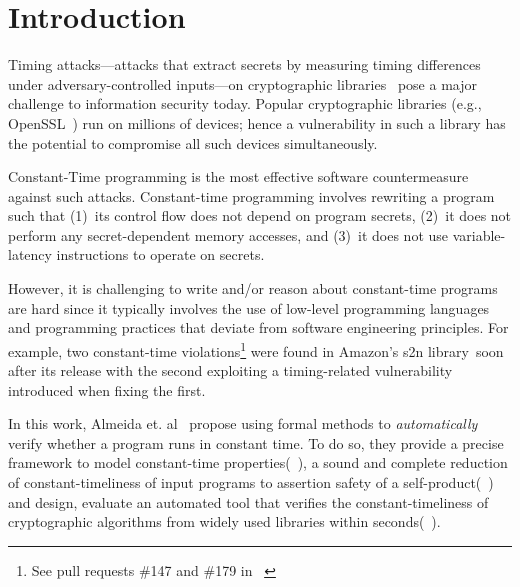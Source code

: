 \section{Introduction}

Timing attacks---attacks that extract secrets by measuring timing differences under adversary-controlled inputs---on cryptographic libraries~\cite{bernstein_cache_timing_attacks, dsa_exponentiations} pose a major challenge to information security today. 
Popular cryptographic libraries (e.g., OpenSSL~\cite{openssl}) run on millions of devices; hence a vulnerability in such a library has the potential to compromise all such devices simultaneously.

Constant-Time programming is the most effective software countermeasure against such attacks.
Constant-time programming involves rewriting a program such that (1)~its control flow does not depend on program secrets, (2)~it does not perform any secret-dependent memory accesses, and (3)~it does not use variable-latency instructions to operate on secrets.

However, it is challenging to write and/or reason about constant-time programs are hard since it typically involves the use of low-level programming languages and programming practices that deviate from software engineering principles.
For example, two constant-time violations\footnote{See pull requests \#147 and \#179 in ~\cite{s2n}} were found in Amazon's s2n library~\cite{s2n}soon after its release with the second exploiting a timing-related vulnerability introduced when fixing the first.

In this work, Almeida et. al~\cite{almeida} propose using formal methods to \emph{automatically} verify whether a program runs in constant time. 
To do so, they provide a precise framework to model constant-time properties(~), a sound and complete reduction of constant-timeliness of input programs to assertion safety of a self-product(~) and design, evaluate an automated tool that verifies the constant-timeliness of cryptographic algorithms from widely used libraries within seconds(~). 
